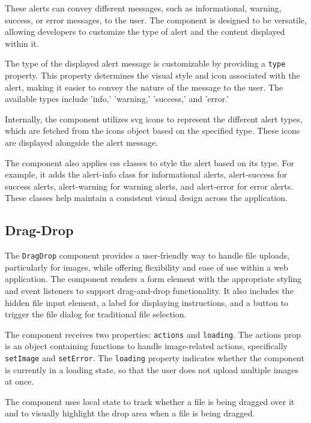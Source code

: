 These alerts can convey different messages, such as informational, warning, success, or error messages, to the user. The component is designed to be versatile, allowing developers to customize the type of alert and the content displayed within it.

The type of the displayed alert message is customizable by providing a \texttt{type} property. This property determines the visual style and icon associated with the alert, making it easier to convey the nature of the message to the user. The available types include 'info,' 'warning,' 'success,' and 'error.'

Internally, the component utilizes \acrfull{svg} icons to represent the different alert types, which are fetched from the icons object based on the specified type. These icons are displayed alongside the alert message.

The component also applies \acrshort{css} classes to style the alert based on its type. For example, it adds the alert-info class for informational alerts, alert-success for success alerts, alert-warning for warning alerts, and alert-error for error alerts. These classes help maintain a consistent visual design across the application.

\subsection{Drag-Drop}

The \texttt{DragDrop} component provides a user-friendly way to handle file uploads, particularly for images, while offering flexibility and ease of use within a web application. The component renders a form element with the appropriate styling and event listeners to support drag-and-drop functionality. It also includes the hidden file input element, a label for displaying instructions, and a button to trigger the file dialog for traditional file selection.

The component receives two properties: \texttt{actions} and \texttt{loading}. The actions prop is an object containing functions to handle image-related actions, specifically \texttt{setImage} and \texttt{setError}. The \texttt{loading} property indicates whether the component is currently in a loading state, so that the user does not upload multiple images at once.

The component uses local state to track whether a file is being dragged over it and to visually highlight the drop area when a file is being dragged.

